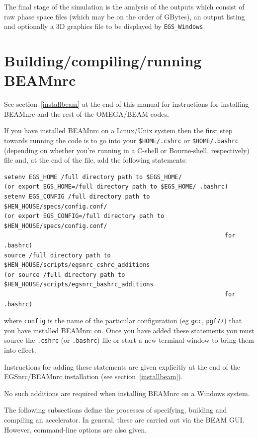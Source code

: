 \documentclass[12pt,twoside]{article}
\begin{document}
The final stage of the simulation is the analysis of the outputs which
consist of raw phase space files (which may be on the order of GBytes),
an output listing and optionally a 3D graphics file to be displayed
by {\tt EGS\_Windows}\cite{TR99a}.

\section{Building/compiling/running BEAMnrc}

See section~\ref{installbeam} at the end of this manual for
instructions for installing BEAMnrc and the rest of
the OMEGA/BEAM codes.

If you have installed BEAMnrc on a Linux/Unix system then the first
step towards running the code is to go into your {\tt \$HOME/.cshrc}
or {\tt \$HOME/.bashrc} (depending on whether you're running in a C-shell
or Bourne-shell, respectively) file and, at the end of the file, add the
following statements:
\begin{verbatim}
setenv EGS_HOME /full directory path to $EGS_HOME/
(or export EGS_HOME=/full directory path to $EGS_HOME/ .bashrc)
setenv EGS_CONFIG /full directory path to $HEN_HOUSE/specs/config.conf/
(or export EGS_CONFIG=/full directory path to $HEN_HOUSE/specs/config.conf/
                                                              for .bashrc)
source /full directory path to $HEN_HOUSE/scripts/egsnrc_cshrc_additions
(or source /full directory path to $HEN_HOUSE/scripts/egsnrc_bashrc_additions
                                                              for .bashrc)
\end{verbatim}
where {\tt config} is the name of the particular configuration
(eg {\tt gcc}, {\tt pgf77}) that you have installed BEAMnrc on.
Once you have added these statements you must source the {\tt .cshrc}
(or {\tt .bashrc}) file or start a new terminal window to bring them into effect.

Instructions for adding these statements are given explicitly at the
end of the EGSnrc/BEAMnrc installation (see section~\ref{installbeam}).

No such additions are required when installing BEAMnrc on a Windows system.

The following subsections define the processes of specifying, building and
compiling an accelerator.  In general, these are carried out via the BEAM GUI.
However, command-line options are also given.
\end{document}
